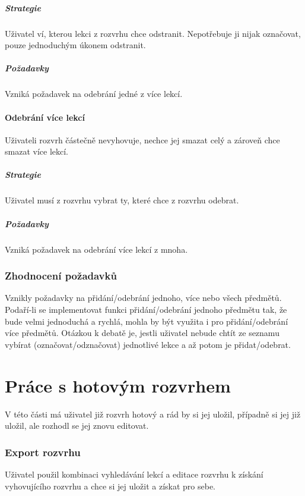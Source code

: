 \documentclass[a4paper, 11pt]{article}
\begin{document}
\subsubsection{Strategie}
Uživatel ví, kterou lekci z rozvrhu chce odstranit. Nepotřebuje ji nijak označovat, pouze jednoduchým úkonem odstranit.

\subsubsection{Požadavky}
Vzniká požadavek na odebrání jedné z více lekcí.

\subsection{Odebrání více lekcí}
Uživateli rozvrh částečně nevyhovuje, nechce jej smazat celý a zároveň chce smazat více lekcí.

\subsubsection{Strategie}
Uživatel musí z rozvrhu vybrat ty, které chce z rozvrhu odebrat.

\subsubsection{Požadavky}
Vzniká požadavek na odebrání více lekcí z mnoha.

\section{Zhodnocení požadavků}
Vznikly požadavky na přidání/odebrání jednoho, více nebo všech předmětů.  Podaří-li se implementovat funkci přidání/odebrání jednoho předmětu tak, že bude velmi jednoduchá a rychlá, mohla by být využita i pro přidání/odebrání více předmětů. Otázkou k debatě je, jestli uživatel nebude chtít ze seznamu vybírat (označovat/odznačovat) jednotlivé lekce a až potom je přidat/odebrat.

\part{Práce s hotovým rozvrhem}
V této části má uživatel již rozvrh hotový a rád by si jej uložil, případně si jej již uložil, ale rozhodl se jej znovu editovat.

\section{Export rozvrhu}
Uživatel použil kombinaci vyhledávání lekcí a editace rozvrhu k získání vyhovujícího rozvrhu a chce si jej uložit a získat pro sebe.
\end{document}
